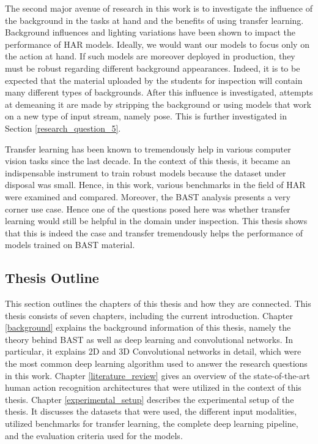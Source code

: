 \documentclass[extern,palatino]{cgMA}
\begin{document}
\bigskip
\noindent The second major avenue of research in this work is to investigate the influence of the background in the tasks at hand and the benefits of using transfer learning. Background influences and lighting variations have been shown to impact the performance of HAR models. Ideally, we would want our models to focus only on the action at hand. If such models are moreover deployed in production,  they must be robust regarding different background appearances. Indeed, it is to be expected that the material uploaded by the students for inspection will contain many different types of backgrounds.  After this influence is investigated, attempts at demeaning it are made by stripping the background or using models that work on a new type of input stream, namely pose. This is further investigated in Section \ref{research_question_5}.

\bigskip
\noindent Transfer learning has been known to tremendously help in various computer vision tasks since the last decade. In the context of this thesis, it became an indispensable instrument to train robust models because the dataset under disposal was small. Hence, in this work, various benchmarks in the field of HAR were examined and compared. Moreover, the BAST analysis presents a very corner use case. Hence one of the questions posed here was whether transfer learning would still be helpful in the domain under inspection. This thesis shows that this is indeed the case and transfer tremendously helps the performance of models trained on BAST material.

\subsection{Thesis Outline}
\label{thesis_outline}

This section outlines the chapters of this thesis and how they are connected. This thesis consists of seven chapters, including the current introduction. Chapter \ref{background} explains the background information of this thesis, namely the theory behind BAST as well as deep learning and convolutional networks. In particular, it explains 2D and 3D Convolutional networks in detail, which were the most common deep learning algorithm used to answer the research questions in this work. Chapter \ref{literature_review} gives an overview of the state-of-the-art human action recognition architectures that were utilized in the context of this thesis. Chapter \ref{experimental_setup} describes the experimental setup of the thesis. It discusses the datasets that were used, the different input modalities, utilized benchmarks for transfer learning, the complete deep learning pipeline, and the evaluation criteria used for the models. 
\end{document}

